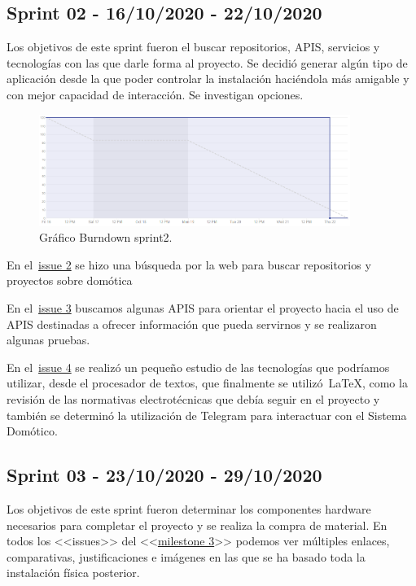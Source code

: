 \subsection{Sprint 02 - 16/10/2020 - 22/10/2020}
Los objetivos de este sprint fueron el buscar repositorios, APIS, servicios y tecnologías con las que darle forma al proyecto. Se decidió generar algún tipo de aplicación desde la que poder controlar la instalación haciéndola más amigable y con mejor capacidad de interacción. Se investigan opciones.

\begin{figure}[h]
    \centering
    \includegraphics[width=0.9\textwidth]{img/BurnDown/2.PNG}
    \caption{Gráfico Burndown sprint2. } \label{BD2}
\end{figure}


\item En el~\href{https://github.com/davidelinformatico/TFG/issues/2}{issue 2} se hizo una búsqueda por la web para buscar repositorios y proyectos sobre domótica
\item En el~\href{https://github.com/davidelinformatico/TFG/issues/3}{issue 3} buscamos algunas APIS para orientar el proyecto hacia el uso de APIS destinadas a ofrecer información que pueda servirnos y se realizaron algunas pruebas.
\item En el~\href{https://github.com/davidelinformatico/TFG/issues/4}{issue 4} se realizó un pequeño estudio de las tecnologías que podríamos utilizar, desde el procesador de textos, que finalmente se utilizó~\LaTeX{}, como la revisión de las normativas electrotécnicas que debía seguir en el proyecto y también se determinó la utilización de Telegram para interactuar con el Sistema Domótico.


\subsection{Sprint 03 - 23/10/2020 - 29/10/2020}
Los objetivos de este sprint fueron determinar los componentes hardware necesarios para completar el proyecto y se realiza la compra de material.
En todos los <<issues>> del <<\href{https://github.com/davidelinformatico/TFG/milestone/3?closed=1}{milestone 3}>> podemos ver múltiples enlaces, comparativas, justificaciones e imágenes en las que se ha basado toda la instalación física posterior.

